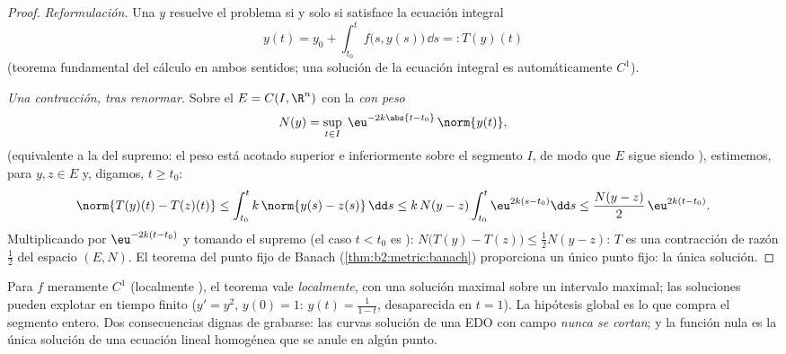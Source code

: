 \begin{proof}
\emph{Reformulación.} Una $y$  resuelve el problema si y solo
si satisface la ecuación integral
\[
y(t) = y_0 + \int_{t_0}^{t} f\bigl(s, y(s)\bigr)\,\dd s
=: T(y)(t)
\]
(teorema fundamental del cálculo en ambos sentidos; una solución
 de la ecuación integral es automáticamente $C^1$).

\emph{Una contracción, tras renormar.} Sobre el  $E =
C(I, \R^n)$ con la  \emph{con peso}
\[
N(y) = \sup_{t \in I}\; \eu^{-2k\abs{t - t_0}}\,\norm{y(t)} ,
\]
(equivalente a la  del supremo: el peso está acotado superior e
inferiormente sobre el segmento $I$, de modo que $E$ sigue siendo
), estimemos, para $y, z \in E$ y, digamos, $t \geq t_0$:
\[
\norm{T(y)(t) - T(z)(t)}
\leq \int_{t_0}^{t} k\,\norm{y(s) - z(s)}\,\dd s
\leq k\,N(y - z)\int_{t_0}^{t} \eu^{2k(s - t_0)}\dd s
\leq \frac{N(y-z)}{2}\,\eu^{2k(t - t_0)} .
\]
Multiplicando por $\eu^{-2k(t - t_0)}$ y tomando el supremo (el caso
$t < t_0$ es ): $N\bigl(T(y) - T(z)\bigr) \leq \frac12 N(y -
z)$: $T$ es una contracción de razón $\frac12$ del espacio 
$(E, N)$. El teorema del punto fijo de Banach
(\cref{thm:b2:metric:banach}) proporciona un único punto fijo: la
única solución.
\end{proof}

\begin{remark}
Para $f$ meramente $C^1$ (localmente ), el teorema vale
\emph{localmente}, con una solución maximal sobre un intervalo
 maximal; las soluciones pueden explotar en tiempo finito ($y'
= y^2$, $y(0) = 1$: $y(t) = \frac{1}{1-t}$, desaparecida en $t = 1$).
La hipótesis  global es lo que compra el segmento entero.
Dos consecuencias dignas de grabarse: las curvas solución de una EDO
con campo  \emph{nunca se cortan}; y la función nula es la
única solución de una ecuación lineal homogénea que se anule en algún
punto.
\end{remark}

